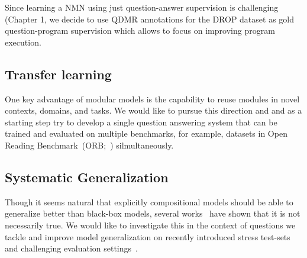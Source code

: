 \documentclass[main.tex]{subfiles}
\begin{document}
Since learning a NMN using just question-answer supervision is challenging (Chapter 1, we decide to use QDMR annotations for the DROP dataset as gold question-program supervision which allows to focus on improving program execution.

\subsection{Transfer learning}
One key advantage of modular models is the capability to reuse modules in novel contexts, domains, and tasks. We would like to pursue this direction and and as a starting step try to develop a single question answering system that can be trained and evaluated on multiple benchmarks, for example, datasets in Open Reading Benchmark~(ORB;~) silmultaneously.

\subsection{Systematic Generalization}
Though it seems natural that explicitly compositional models should be able to generalize better than black-box models, several works~\cite{sys-generalization-2018,closure-generalization-2020} have shown that it is not necessarily true. We would like to investigate this in the context of questions we tackle and improve model generalization on recently introduced stress test-sets~\cite{contrast-sets-2020} and challenging evaluation settings~\cite{text2sql-2018}.









\end{document}
